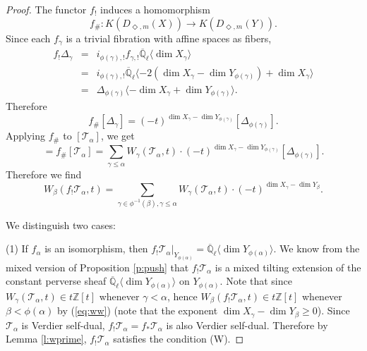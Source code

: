 \documentclass{amsart}
\theoremstyle{plain}
\theoremstyle{definition}
\theoremstyle{remark}
\numberwithin{equation}{subsection}
\begin{document}
\begin{proof}
The functor $f_!$ induces a homomorphism
\begin{equation*}
f_\#:K({D_{\Diamond,m}({X})})\to K({D_{\Diamond,m}({Y})}).
\end{equation*}
Since each $f_\gamma$ is a trivial fibration with affine spaces as fibers, 
\begin{eqnarray*}
f_!\Delta_\gamma&=&i_{\phi(\gamma),!}f_{\gamma,!}{\overline{\mathbb{Q}}_{\ell}}{\langle{{\dim X_\gamma}}\rangle}\\
&=&i_{\phi(\gamma),!}{\overline{\mathbb{Q}}_{\ell}}{\langle{{-2(\dim X_\gamma-\dim Y_{\phi(\gamma)})+\dim X_\gamma}}\rangle}\\
&=&\Delta_{\phi(\gamma)}{\langle{{-\dim X_\gamma+\dim Y_{\phi(\gamma)}}}\rangle}.
\end{eqnarray*}
Therefore
\begin{equation*}
f_\#[\Delta_\gamma]=(-t)^{\dim X_\gamma-\dim Y_{\phi(\gamma)}}[\Delta_{\phi(\gamma)}].
\end{equation*}
Applying $f_\#$ to $[{\mathcal{T}}_\alpha]$, we get
\begin{equation*}
[f_!{\mathcal{T}}_\alpha]=f_\#[{\mathcal{T}}_\alpha]=\sum_{\gamma\leq\alpha}W_\gamma({\mathcal{T}}_\alpha,t)\cdot(-t)^{\dim X_\gamma-\dim Y_{\phi(\gamma)}}[\Delta_{\phi(\gamma)}].
\end{equation*}
Therefore we find
\begin{equation}\label{eq:ww}
W_\beta(f_!{\mathcal{T}}_\alpha,t)=\sum_{\gamma\in\phi^{-1}(\beta),\gamma\leq\alpha}W_\gamma({\mathcal{T}}_\alpha,t)\cdot(-t)^{\dim X_\gamma-\dim Y_{\beta}}.
\end{equation}

We distinguish two cases: 

(1) If $f_\alpha$ is an isomorphism, then $f_!{\mathcal{T}}_\alpha|_{Y_{\phi(\alpha)}}={\overline{\mathbb{Q}}_{\ell}}{\langle{{\dim Y_{\phi(\alpha)}}}\rangle}$. We know from the mixed version of Proposition \ref{p:push} that $f_!{\mathcal{T}}_\alpha$ is a mixed tilting extension of the constant perverse sheaf ${\overline{\mathbb{Q}}_{\ell}}{\langle{{\dim Y_{\phi(\alpha)}}}\rangle}$ on $Y_{\phi(\alpha)}$. Note that since $W_\gamma({\mathcal{T}}_\alpha,t)\in t{\mathbb{Z}}[t]$ whenever $\gamma<\alpha$, hence $W_{\beta}(f_!{\mathcal{T}}_\alpha,t)\in t{\mathbb{Z}}[t]$ whenever $\beta<\phi(\alpha)$ by (\ref{eq:ww}) (note that the exponent $\dim X_\gamma-\dim Y_{\beta}\geq0$). Since ${\mathcal{T}}_\alpha$ is Verdier self-dual, $f_!{\mathcal{T}}_\alpha=f_*{\mathcal{T}}_\alpha$ is also Verdier self-dual. Therefore by Lemma \ref{l:wprime}, $f_!{\mathcal{T}}_\alpha$ satisfies the condition (W).


\end{proof}
\end{document}
